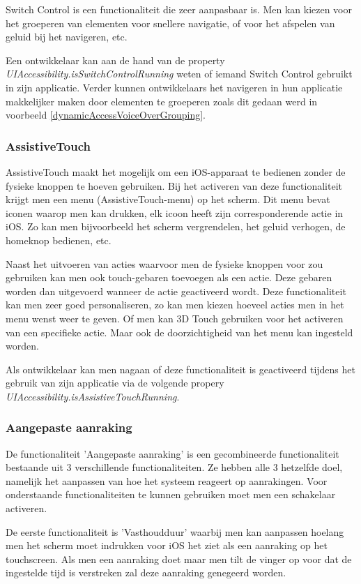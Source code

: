 Switch Control is een functionaliteit die zeer aanpasbaar is. Men kan kiezen voor het groeperen van elementen voor snellere navigatie, of voor het afspelen van geluid bij het navigeren, etc.

Een ontwikkelaar kan aan de hand van de property \emph{UIAccessibility.isSwitchControlRunning} weten of iemand Switch Control gebruikt in zijn applicatie. Verder kunnen ontwikkelaars het navigeren in hun applicatie makkelijker maken door elementen te groeperen zoals dit gedaan werd in voorbeeld \ref{dynamicAccessVoiceOverGrouping}.
\subsubsection{AssistiveTouch}
AssistiveTouch maakt het mogelijk om een iOS-apparaat te bedienen zonder de fysieke knoppen te hoeven gebruiken. Bij het activeren van deze functionaliteit krijgt men een menu (AssistiveTouch-menu) op het scherm. Dit menu bevat iconen waarop men kan drukken, elk icoon heeft zijn corresponderende actie in iOS. Zo kan men bijvoorbeeld het scherm vergrendelen, het geluid verhogen, de homeknop bedienen, etc.

Naast het uitvoeren van acties waarvoor men de fysieke knoppen voor zou gebruiken kan men ook touch-gebaren toevoegen als een actie.  Deze gebaren worden dan uitgevoerd wanneer de actie geactiveerd wordt. Deze functionaliteit kan men zeer goed personaliseren, zo kan men kiezen hoeveel acties men in het menu wenst weer te geven. Of men kan 3D Touch gebruiken voor het activeren van een specifieke actie.  Maar ook de doorzichtigheid van het menu kan ingesteld worden.

Als ontwikkelaar kan men nagaan of deze functionaliteit is geactiveerd tijdens het gebruik van zijn applicatie via de volgende propery \emph{UIAccessibility.isAssistiveTouchRunning}.
\subsubsection{Aangepaste aanraking}

De functionaliteit 'Aangepaste aanraking' is een gecombineerde functionaliteit bestaande uit 3 verschillende functionaliteiten. Ze hebben alle 3 hetzelfde doel, namelijk het aanpassen van hoe het systeem reageert op aanrakingen. Voor onderstaande functionaliteiten te kunnen gebruiken moet men een schakelaar activeren.

De eerste functionaliteit is 'Vasthoudduur' waarbij men kan aanpassen hoelang men het scherm moet indrukken voor iOS het ziet als een aanraking op het touchscreen. Als men een aanraking doet maar men tilt de vinger op voor dat de ingestelde tijd is verstreken zal deze aanraking genegeerd worden. 


